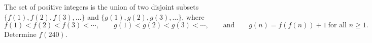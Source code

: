 The set of positive integers is the union of two disjoint subsets $\{f(1),f(2),f(3),\dots\}$ and $\{g(1),g(2),g(3),\dots\}$, where
\[f(1)<f(2)<f(3)<\cdots,\qquad g(1)<g(2)<g(3)<\cdots,\qquad\text{and}\qquad g(n)=f(f(n))+1\ \text{for all } n\ge1.\]
Determine $f(240)$.
